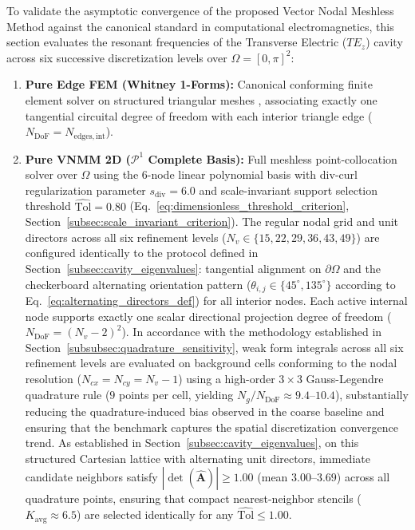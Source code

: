 \documentclass[preprint,12pt]{elsarticle}
\begin{document}
To validate the asymptotic convergence of the proposed Vector Nodal Meshless Method against the canonical standard in computational electromagnetics, this section evaluates the resonant frequencies of the Transverse Electric ($TE_z$) cavity across six successive discretization levels over $\Omega = [0, \pi]^2$:
\begin{enumerate}
    \item \textbf{Pure Edge FEM (Whitney 1-Forms):} Canonical conforming finite element solver on structured triangular meshes \cite{monk2003finite}, associating exactly one tangential circuital degree of freedom with each interior triangle edge ($N_{\mathrm{DoF}} = N_{\mathrm{edges, int}}$).
    \item \textbf{Pure VNMM 2D ($\mathcal{P}^1$ Complete Basis):} Full meshless point-collocation solver over $\Omega$ using the 6-node linear polynomial basis with div-curl regularization parameter $s_{\mathrm{div}} = 6.0$ and scale-invariant support selection threshold $\widehat{\mathrm{Tol}} = 0.80$ (Eq.~\eqref{eq:dimensionless_threshold_criterion}, Section~\ref{subsec:scale_invariant_criterion}). The regular nodal grid and unit directors across all six refinement levels ($N_v \in \{15, 22, 29, 36, 43, 49\}$) are configured identically to the protocol defined in Section~\ref{subsec:cavity_eigenvalues}: tangential alignment on $\partial\Omega$ and the checkerboard alternating orientation pattern ($\theta_{i,j} \in \{45^\circ, 135^\circ\}$ according to Eq.~\eqref{eq:alternating_directors_def}) for all interior nodes. Each active internal node supports exactly one scalar directional projection degree of freedom ($N_{\mathrm{DoF}} = (N_v - 2)^2$). In accordance with the methodology established in Section~\ref{subsubsec:quadrature_sensitivity}, weak form integrals across all six refinement levels are evaluated on background cells conforming to the nodal resolution ($N_{cx} = N_{cy} = N_v - 1$) using a high-order $3 \times 3$ Gauss-Legendre quadrature rule ($9$ points per cell, yielding $N_g / N_{\mathrm{DoF}} \approx 9.4\text{--}10.4$), substantially reducing the quadrature-induced bias observed in the coarse baseline and ensuring that the benchmark captures the spatial discretization convergence trend. As established in Section~\ref{subsec:cavity_eigenvalues}, on this structured Cartesian lattice with alternating unit directors, immediate candidate neighbors satisfy $|\det(\widehat{\mathbf{A}})| \ge 1.00$ (mean $3.00\text{--}3.69$) across all quadrature points, ensuring that compact nearest-neighbor stencils ($K_{\mathrm{avg}} \approx 6.5$) are selected identically for any $\widehat{\mathrm{Tol}} \le 1.00$.
\end{enumerate}
\end{document}
